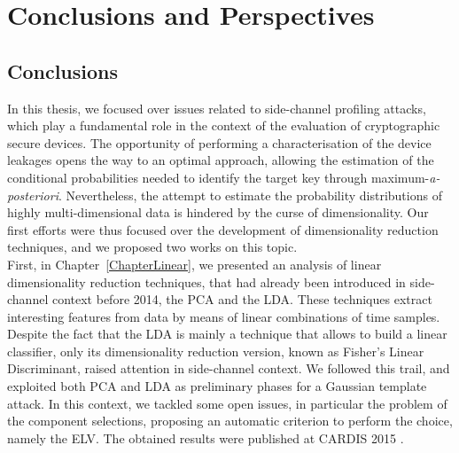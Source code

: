 
\chapter{Conclusions and Perspectives} %

\label{ChapterConclusions}



\section{Conclusions}
In this thesis, we focused over issues related to side-channel profiling attacks, which play a fundamental role in the context of the evaluation of cryptographic secure devices. The opportunity of performing a characterisation of the device leakages opens the way to an optimal approach, allowing the estimation of the conditional probabilities needed to identify the target key through maximum-\textit{a-posteriori}. Nevertheless, the attempt to estimate the probability distributions of highly multi-dimensional data is hindered by the curse of dimensionality. Our first efforts were thus
focused over the development of dimensionality reduction techniques, and we proposed two works on this topic.\\
 
First, in Chapter~\ref{ChapterLinear}, we presented an analysis of linear dimensionality reduction techniques, that had already been introduced in side-channel context before 2014, the PCA and the LDA. These techniques extract interesting features from data by means of linear combinations of time samples. Despite the fact that the LDA is mainly a technique that allows to build a linear classifier, only its dimensionality reduction version, known as Fisher's Linear Discriminant, raised attention in side-channel context. We followed this trail, and exploited both PCA and LDA as preliminary phases for a Gaussian template attack. In this context, we tackled some open issues, in particular the problem of the component selections, proposing an automatic criterion to perform the choice, namely the ELV.  The obtained results were published at CARDIS 2015 \cite{Cagli2016}.\\


